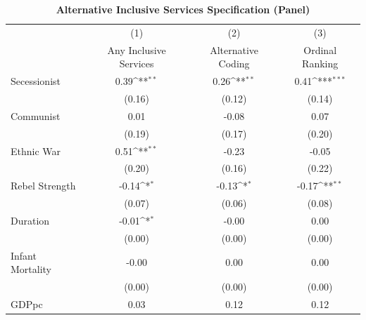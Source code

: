 \documentclass[12pt, letterpaper]{article}
\begin{document}
\newpage
\begin{table}[htbp]\centering
\begin{small}
\def\sym#1{\ifmmode^{#1}\else\(^{#1}\)\fi}
\renewcommand\thetable{A.\Roman{table}}
\makeatletter
\def\myrow{}
\CT@everycr{\noalign{%
\global\let\CT@row@color\relax
\stepcounter{mym22}%
\ifnum\value{mym22}=3
  \gdef\myrow{\rowcolor{gray!50}}
\else\ifnum\value{mym22}=5
  \gdef\myrow{}
\fi\fi
}\myrow}
\caption{\textbf{Alternative Inclusive Services Specification (Panel)}}
\label{table:altpgp}
\begin{tabular}{l*{3}{c}}
\hline\hline
                    &\multicolumn{1}{c}{(1)}&\multicolumn{1}{c}{(2)}&\multicolumn{1}{c}{(3)}\\
                                        &\multicolumn{1}{c}{Any Inclusive Services}&\multicolumn{1}{c}{Alternative Coding}&\multicolumn{1}{c}{Ordinal Ranking}\\
\hline
Secessionist      &        0.39\sym{**} &        0.26\sym{**} &        0.41\sym{***}\\
                    &      (0.16)         &      (0.12)         &      (0.14)         \\
Communist           &        0.01         &       -0.08         &        0.07         \\
                    &      (0.19)         &      (0.17)         &      (0.20)         \\
Ethnic War          &        0.51\sym{**} &       -0.23         &       -0.05         \\
                    &      (0.20)         &      (0.16)         &      (0.22)         \\
Rebel Strength      &       -0.14\sym{*}  &       -0.13\sym{*}  &       -0.17\sym{**} \\
                    &      (0.07)         &      (0.06)         &      (0.08)         \\
Duration            &       -0.01\sym{*}  &       -0.00         &        0.00         \\
                    &      (0.00)         &      (0.00)         &      (0.00)         \\
Infant Mortality    &       -0.00         &        0.00         &        0.00         \\
                    &      (0.00)         &      (0.00)         &      (0.00)         \\
GDPpc               &        0.03         &        0.12         &        0.12         \\

\end{tabular}
\end{small}
\end{table}
\end{document}

